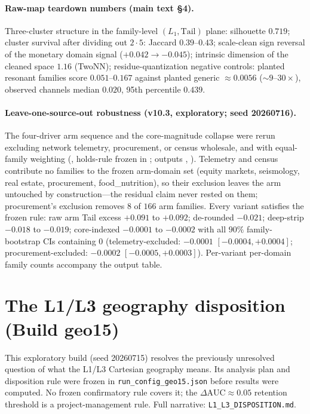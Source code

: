 \documentclass[12pt]{article}
\begin{document}
\paragraph{Raw-map teardown numbers (main text \S4).}
Three-cluster structure in the family-level $(L_1, \mathrm{Tail})$ plane:
silhouette $0.719$; cluster survival after dividing out $2\cdot5$: Jaccard
$0.39$--$0.43$; scale-clean sign reversal of the monetary domain signal
($+0.042 \to -0.045$); intrinsic dimension of the cleaned space $1.16$
(TwoNN); residue-quantization negative controls: planted resonant families
score $0.051$--$0.167$ against planted generic $\approx 0.0056$
(${\sim}9$--$30\times$), observed channels median $0.020$, 95th percentile $0.439$.

\paragraph{Leave-one-source-out robustness (v10.3, exploratory; seed
20260716).} The four-driver arm sequence and the core-magnitude collapse
were rerun excluding network telemetry, procurement, or census wholesale,
and with equal-family weighting (, holds-rule frozen in
; outputs ,
).
Telemetry and census contribute no families to the frozen arm-domain set
(equity markets, seismology, real estate, procurement, food\_nutrition), so
their exclusion leaves the arm untouched by construction---the residual
claim never rested on them; procurement's exclusion removes $8$ of $166$ arm
families. Every variant satisfies the frozen rule: raw arm Tail excess
$+0.091$ to $+0.092$; de-rounded $-0.021$; deep-strip $-0.018$ to $-0.019$;
core-indexed $-0.0001$ to $-0.0002$ with all $90\%$ family-bootstrap CIs
containing $0$ (telemetry-excluded: $-0.0001$ $[-0.0004, +0.0004]$;
procurement-excluded: $-0.0002$ $[-0.0005, +0.0003]$). Per-variant
per-domain family counts accompany the output table.

\section{The L1/L3 geography disposition (Build geo15)}
\label{s:geo15}

This exploratory build (seed 20260715) resolves the previously unresolved question of what the L1/L3 Cartesian
geography means. Its analysis plan and disposition rule were frozen in
\texttt{run\_config\_geo15.json} before results were computed. No frozen
confirmatory rule covers it; the $\Delta\mathrm{AUC} \approx 0.05$ retention
threshold is a project-management rule. Full narrative:
\texttt{L1\_L3\_DISPOSITION.md}.
\end{document}
